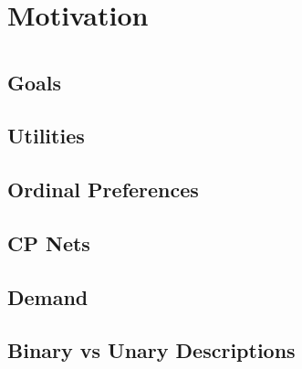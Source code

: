 \documentclass{article}
\begin{document}
%	
%	
%	
%	
%	
%	
	
	
	
	\section{Motivation}
	
	\section{} %
	
	\subsection{Goals}
	
	\subsection{Utilities}
	\subsection{Ordinal Preferences}
	\subsection{CP Nets}
	\subsection{Demand}
	\subsection{Binary vs Unary Descriptions}
	
\end{document}

